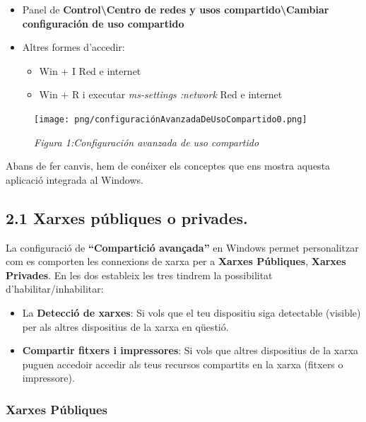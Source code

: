 \documentclass[
  a4paper,
]{article}
\providecommand{\tightlist}{%
  \setlength{\itemsep}{0pt}\setlength{\parskip}{0pt}}
\begin{document}
\begin{itemize}
\item
  Panel de \textbf{Control\textbackslash Centro de redes y usos
  compartido\textbackslash Cambiar configuración de uso compartido}
\item
  Altres formes d'accedir:

  \begin{itemize}
  \tightlist
  \item
    Win + I Red e internet
  \item
    Win + R i executar \emph{ms-settings :network} Red e internet
  \end{itemize}
\end{itemize}

\begin{figure}
\centering
\texttt{[image: png/configuraciónAvanzadaDeUsoCompartido0.png]}
\caption{\emph{Figura 1:Configuración avanzada de uso compartido}}
\end{figure}

Abans de fer canvis, hem de conéixer els conceptes que ens mostra
aquesta aplicació integrada al Windows.

\subsection{2.1 Xarxes públiques o
privades.}\label{xarxes-puxfabliques-o-privades.}

La configuració de \textbf{``Compartició avançada''} en Windows permet
personalitzar com es comporten les connexions de xarxa per a
\textbf{Xarxes Públiques}, \textbf{Xarxes Privades}. En les dos
estableix les tres tindrem la possibilitat d'habilitar/inhabilitar:

\begin{itemize}
\tightlist
\item
  La \textbf{Detecció de xarxes}: Si vols que el teu dispositiu siga
  detectable (visible) per als altres dispositius de la xarxa en
  qüestió.
\item
  \textbf{Compartir fitxers i impressores}: Si vols que altres
  dispositius de la xarxa puguen accedoir accedir als teus recursos
  compartits en la xarxa (fitxers o impressore).
\end{itemize}

\subsubsection{\texorpdfstring{\textbf{Xarxes
Públiques}}{Xarxes Públiques}}\label{xarxes-puxfabliques}
\end{document}
